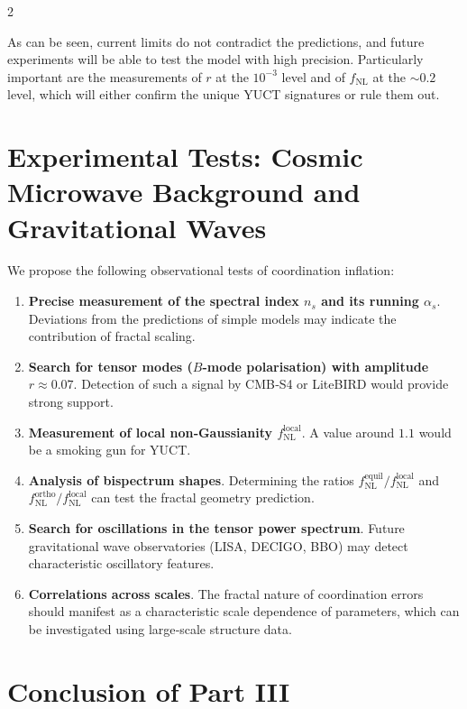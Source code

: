 \documentclass[12pt,a4paper]{article}
\begin{document}
	\begin{multicols}{2}
		
		As can be seen, current limits do not contradict the predictions, and future experiments will be able to test the model with high precision. Particularly important are the measurements of \(r\) at the \(10^{-3}\) level and of \(f_{\text{NL}}\) at the \(\sim 0.2\) level, which will either confirm the unique YUCT signatures or rule them out.
		
		\section{Experimental Tests: Cosmic Microwave Background and Gravitational Waves}
		\label{sec:tests}
		
		We propose the following observational tests of coordination inflation:
		
		\begin{enumerate}
			\item \textbf{Precise measurement of the spectral index \(n_s\) and its running \(\alpha_s\)}. Deviations from the predictions of simple models may indicate the contribution of fractal scaling.
			\item \textbf{Search for tensor modes (\(B\)-mode polarisation) with amplitude \(r \approx 0.07\)}. Detection of such a signal by CMB‑S4 or LiteBIRD would provide strong support.
			\item \textbf{Measurement of local non‑Gaussianity \(f_{\text{NL}}^{\text{local}}\)}. A value around \(1.1\) would be a smoking gun for YUCT.
			\item \textbf{Analysis of bispectrum shapes}. Determining the ratios \(f_{\text{NL}}^{\text{equil}}/f_{\text{NL}}^{\text{local}}\) and \(f_{\text{NL}}^{\text{ortho}}/f_{\text{NL}}^{\text{local}}\) can test the fractal geometry prediction.
			\item \textbf{Search for oscillations in the tensor power spectrum}. Future gravitational wave observatories (LISA, DECIGO, BBO) may detect characteristic oscillatory features.
			\item \textbf{Correlations across scales}. The fractal nature of coordination errors should manifest as a characteristic scale dependence of parameters, which can be investigated using large‑scale structure data.
		\end{enumerate}
		
		\section{Conclusion of Part III}
		\label{sec:conclusion-inflation}
		

\end{multicols}
\end{document}

